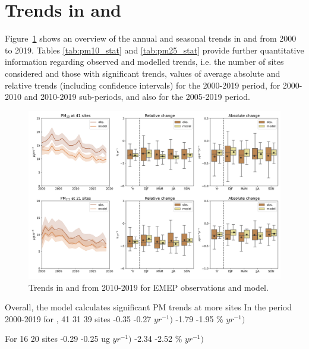 \section{\label{sec:Trends_PM }Trends in \PM[10] and \PM[2.5] }

Figure~\ref{fig:pm_trends} shows an overview of the annual and seasonal trends in \PM[10] and \PM[2.5] from 2000 to 2019. Tables \ref{tab:pm10_stat} and \ref{tab:pm25_stat} provide further quantitative information regarding observed and modelled trends, i.e. the number of sites considered and those with significant trends, values of average absolute and relative trends (including confidence intervals) for the 2000-2019 period, for 2000-2010 and 2010-2019 sub-periods, and also for the 2005-2019 period.


\begin{figure}
	\centering
	\includegraphics[width=0.74\paperwidth]{FIGS_TRENDS/PM_trends.png}
	\caption{\label{fig:pm_trends}Trends in \PM[10]  and \PM[2.5] from 2010-2019 for EMEP observations and model.}
\end{figure}


Overall, the model calculates significant PM trends at more sites 
In the period 2000-2019 for \PM[10] , 41 31 39 sites -0.35  -0.27 \ug $yr^{-1})$  -1.79  -1.95 \% $yr^{-1})$

For  16 20 sites -0.29  -0.25 ug $yr^{-1})$ -2.34  -2.52  \% $yr^{-1})$



